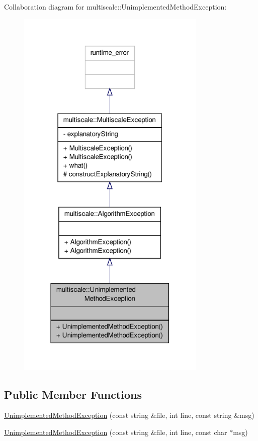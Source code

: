 Collaboration diagram for multiscale\-:\-:Unimplemented\-Method\-Exception\-:
\nopagebreak
\begin{figure}[H]
\begin{center}
\leavevmode
\includegraphics[width=256pt]{classmultiscale_1_1UnimplementedMethodException__coll__graph}
\end{center}
\end{figure}
\subsection*{Public Member Functions}
\begin{DoxyCompactItemize}
\item 
\hyperlink{classmultiscale_1_1UnimplementedMethodException_af3e41ba96ee1376dece07e2f875cbc11}{Unimplemented\-Method\-Exception} (const string \&file, int line, const string \&msg)
\item 
\hyperlink{classmultiscale_1_1UnimplementedMethodException_aff17b782e719904081a27badd18740b2}{Unimplemented\-Method\-Exception} (const string \&file, int line, const char $\ast$msg)
\end{DoxyCompactItemize}
